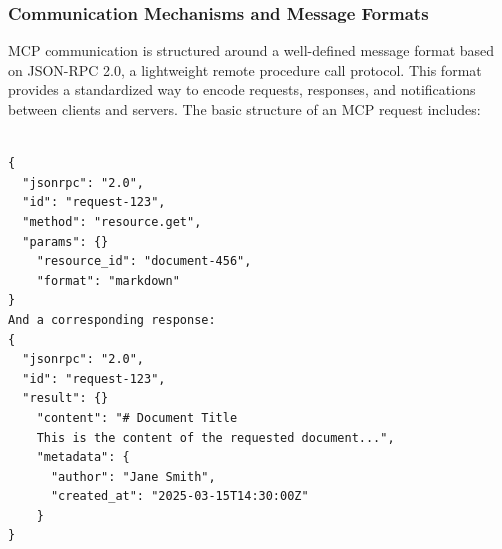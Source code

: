 \subsubsection{Communication Mechanisms and Message Formats}
MCP communication is structured around a well-defined message format based on JSON-RPC 2.0, a lightweight remote procedure call protocol. This format provides a standardized way to encode requests, responses, and notifications between clients and servers.
The basic structure of an MCP request includes:

\begin{verbatim}

{
  "jsonrpc": "2.0",
  "id": "request-123",
  "method": "resource.get",
  "params": {}
    "resource_id": "document-456",
    "format": "markdown"
}
And a corresponding response:
{
  "jsonrpc": "2.0",
  "id": "request-123",
  "result": {}
    "content": "# Document Title
    This is the content of the requested document...",
    "metadata": {
      "author": "Jane Smith",
      "created_at": "2025-03-15T14:30:00Z"
    }
}

\end{verbatim}

